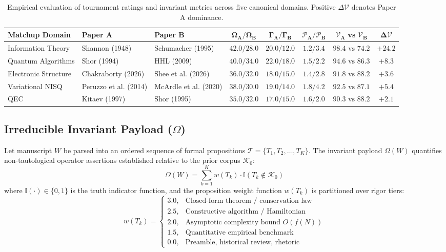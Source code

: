\documentclass[twocolumn,10pt,letterpaper]{article}
\begin{document}
\begin{table}[t]
\centering
\small
\setlength{\tabcolsep}{4pt}
\begin{tabular}{lllccccc}
\toprule
\textbf{Matchup Domain} & \textbf{Paper A} & \textbf{Paper B} & $\mathbf{\Omega_A / \Omega_B}$ & $\mathbf{\Gamma_A / \Gamma_B}$ & $\mathbf{\mathcal{P}_A / \mathcal{P}_B}$ & $\mathbf{\mathcal{V}_A \text{ vs } \mathcal{V}_B}$ & $\mathbf{\Delta \mathcal{V}}$ \\
\midrule
Information Theory & Shannon (1948) & Schumacher (1995) & $42.0 / 28.0$ & $20.0 / 12.0$ & $1.2 / 3.4$ & $98.4 \text{ vs } 74.2$ & $+24.2$ \\
Quantum Algorithms & Shor (1994) & HHL (2009) & $40.0 / 34.0$ & $22.0 / 18.0$ & $1.5 / 2.2$ & $94.6 \text{ vs } 86.3$ & $+8.3$ \\
Electronic Structure & Chakraborty (2026) & Shee et al. (2026) & $36.0 / 32.0$ & $18.0 / 15.0$ & $1.4 / 2.8$ & $91.8 \text{ vs } 88.2$ & $+3.6$ \\
Variational NISQ & Peruzzo et al. (2014) & McArdle et al. (2020) & $38.0 / 30.0$ & $19.0 / 14.0$ & $1.8 / 4.2$ & $92.5 \text{ vs } 87.1$ & $+5.4$ \\
QEC & Kitaev (1997) & Shor (1995) & $35.0 / 32.0$ & $17.0 / 15.0$ & $1.6 / 2.0$ & $90.3 \text{ vs } 88.2$ & $+2.1$ \\
\bottomrule
\end{tabular}
\caption{Empirical evaluation of tournament ratings and invariant metrics across five canonical domains. Positive $\Delta \mathcal{V}$ denotes Paper A dominance.}
\label{tab:tournament}
\end{table}

\subsection{Irreducible Invariant Payload ($\Omega$)}
Let manuscript $W$ be parsed into an ordered sequence of formal propositions $\mathcal{T} = \{T_1, T_2, \dots, T_K\}$. The invariant payload $\Omega(W)$ quantifies non-tautological operator assertions established relative to the prior corpus $\mathcal{K}_0$:
\begin{equation}
\Omega(W) = \sum_{k=1}^K w(T_k) \cdot \mathbb{I}(T_k \notin \mathcal{K}_0)
\end{equation}
where $\mathbb{I}(\cdot) \in \{0, 1\}$ is the truth indicator function, and the proposition weight function $w(T_k)$ is partitioned over rigor tiers:
\begin{equation}
w(T_k) = 
\begin{cases}
3.0, & \text{Closed-form theorem / conservation law} \\
2.5, & \text{Constructive algorithm / Hamiltonian} \\
2.0, & \text{Asymptotic complexity bound } O(f(N)) \\
1.5, & \text{Quantitative empirical benchmark} \\
0.0, & \text{Preamble, historical review, rhetoric}
\end{cases}
\end{equation}
\end{document}
